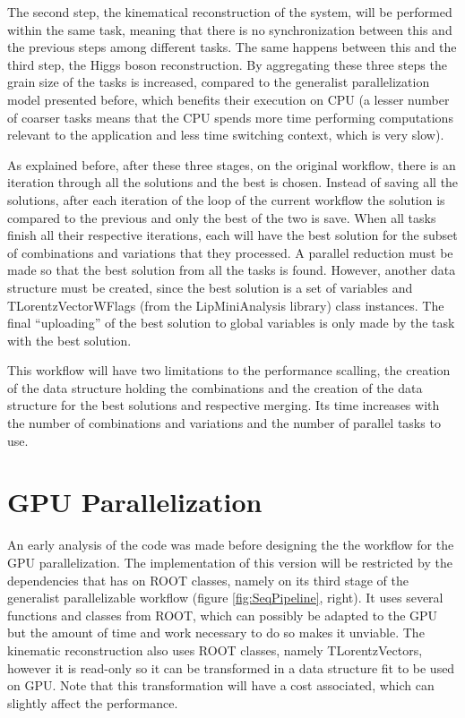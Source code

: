 The second step, the kinematical reconstruction of the \ttbar system, will be performed within the same task, meaning that there is no synchronization between this and the previous steps among different tasks. The same happens between this and the third step, the Higgs boson reconstruction. By aggregating these three steps the grain size of the tasks is increased, compared to the generalist parallelization model presented before, which benefits their execution on CPU (a lesser number of coarser tasks means that the CPU spends more time performing computations relevant to the application and less time switching context, which is very slow).

As explained before, after these three stages, on the original workflow, there is an iteration through all the solutions and the best is chosen. Instead of saving all the solutions, after each iteration of the loop of the current workflow the solution is compared to the previous and only the best of the two is save. When all tasks finish all their respective iterations, each will have the best solution for the subset of combinations and variations that they processed. A parallel reduction must be made so that the best solution from all the tasks is found. However, another data structure must be created, since the best solution is a set of variables and TLorentzVectorWFlags (from the LipMiniAnalysis library) class instances. The final ``uploading'' of the best solution to global variables is only made by the task with the best solution.

This workflow will have two limitations to the performance scalling, the creation of the data structure holding the combinations and the creation of the data structure for the best solutions and respective merging. Its time increases with the number of combinations and variations and the number of parallel tasks to use.

\section{GPU Parallelization}
\label{Parallelization:GPU}

An early analysis of the code was made before designing the the workflow for the GPU parallelization. The implementation of this version will be restricted by the dependencies that \ttDilepKinFit has on ROOT classes, namely on its third stage of the generalist parallelizable workflow (figure \ref{fig:SeqPipeline}, right). It uses several functions and classes from ROOT, which can possibly be adapted to the GPU but the amount of time and work necessary to do so makes it unviable. The kinematic reconstruction also uses ROOT classes, namely TLorentzVectors, however it is read-only so it can be transformed in a data structure fit to be used on GPU. Note that this transformation will have a cost associated, which can slightly affect the performance.

